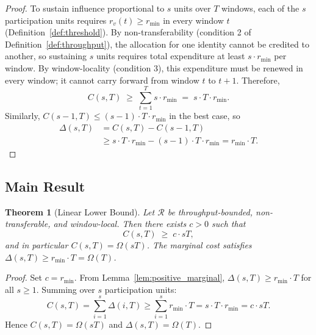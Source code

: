 \documentclass[10pt,journal,compsoc]{IEEEtran}
\newtheorem{theorem}{Theorem}[section]
\theoremstyle{remark}
\begin{document}
	\begin{proof}
		To sustain influence proportional to $s$ units over
		$T$ windows, each of the $s$ participation units
		requires $r_v(t) \geq r_{\min}$ in every window $t$
		(Definition~\ref{def:threshold}).
		By non-transferability (condition 2 of
		Definition~\ref{def:throughput}), the allocation
		for one identity cannot be credited to another,
		so sustaining $s$ units requires total expenditure
		at least $s \cdot r_{\min}$ per window.
		By window-locality (condition 3), this expenditure
		must be renewed in every window; it cannot carry
		forward from window $t$ to $t+1$.
		Therefore,
		\begin{equation}
			C(s, T) \;\geq\; \sum_{t=1}^{T} s \cdot r_{\min}
			\;=\; s \cdot T \cdot r_{\min}.
		\end{equation}
		Similarly, $C(s-1, T) \leq (s-1) \cdot T \cdot r_{\min}$
		in the best case, so
		\begin{align}
			\Delta(s, T)
			&= C(s, T) - C(s-1, T) \nonumber \\
			&\geq s \cdot T \cdot r_{\min} - (s-1) \cdot T \cdot r_{\min}
			= r_{\min} \cdot T.
		\end{align}
	\end{proof}
	
	\subsection{Main Result}
	\label{ssec:theorem_linear}
	
	\begin{theorem}[Linear Lower Bound]
		\label{thm:linear}
		Let $\mathcal{R}$ be throughput-bounded,
		non-transferable, and window-local.
		Then there exists $c > 0$ such that
		\begin{equation}
			C(s, T) \;\geq\; c \cdot sT,
		\end{equation}
		and in particular $C(s,T) = \Omega(sT)$.
		The marginal cost satisfies
		$\Delta(s, T) \geq r_{\min} \cdot T = \Omega(T)$.
	\end{theorem}
	
	\begin{proof}
		Set $c = r_{\min}$.
		From Lemma~\ref{lem:positive_marginal},
		$\Delta(s,T) \geq r_{\min} \cdot T$ for all $s \geq 1$.
		Summing over $s$ participation units:
		\begin{equation}
			C(s, T)
			= \sum_{i=1}^{s} \Delta(i, T)
			\geq \sum_{i=1}^{s} r_{\min} \cdot T
			= s \cdot T \cdot r_{\min}
			= c \cdot sT.
		\end{equation}
		Hence $C(s,T) = \Omega(sT)$ and
		$\Delta(s,T) = \Omega(T)$.
	\end{proof}
	
\end{document}

